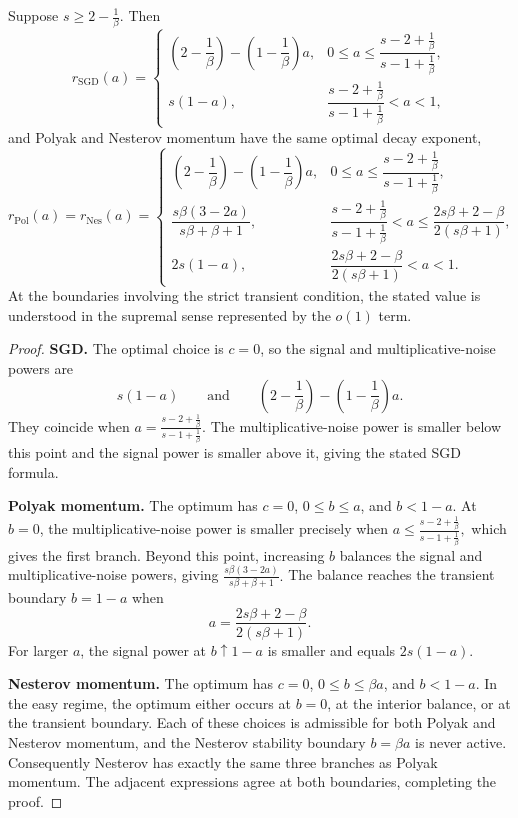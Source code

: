 \begin{theorem}
\label{thm:fixed-batch-data-scaling-noiseless-easy}
Suppose
\(s\geq2-\frac1\beta.\)
Then
\[
r_{\mathrm{SGD}}(a)
=
\begin{cases}
\left(2-\dfrac1\beta\right)-\left(1-\dfrac1\beta\right)a,
&0\leq a\leq\dfrac{s-2+\frac1\beta}{s-1+\frac1\beta},\\[3mm]
s(1-a),
&\dfrac{s-2+\frac1\beta}{s-1+\frac1\beta}<a<1,
\end{cases}
\]
and Polyak and Nesterov momentum have the same optimal decay exponent,
\[
r_{\mathrm{Pol}}(a)
=
r_{\mathrm{Nes}}(a)
=
\begin{cases}
\left(2-\dfrac1\beta\right)-\left(1-\dfrac1\beta\right)a,
&0\leq a\leq\dfrac{s-2+\frac1\beta}{s-1+\frac1\beta},\\[3mm]
\dfrac{s\beta(3-2a)}{s\beta+\beta+1},
&\dfrac{s-2+\frac1\beta}{s-1+\frac1\beta}<a
\leq\dfrac{2s\beta+2-\beta}{2(s\beta+1)},\\[3mm]
2s(1-a),
&\dfrac{2s\beta+2-\beta}{2(s\beta+1)}<a<1.
\end{cases}
\]
At the boundaries involving the strict transient condition, the stated value is understood in the supremal sense represented by the \(o(1)\) term.
\end{theorem}

\begin{proof}
\medskip

\noindent\textbf{SGD.}
The optimal choice is \(c=0\), so the signal and multiplicative-noise powers are
\[
s(1-a)
\qquad\text{and}\qquad
\left(2-\frac1\beta\right)-\left(1-\frac1\beta\right)a.
\]
They coincide when
\(a=\frac{s-2+\frac1\beta}{s-1+\frac1\beta}.\)
The multiplicative-noise power is smaller below this point and the signal power is smaller above it, giving the stated SGD formula.

\medskip

\noindent\textbf{Polyak momentum.}
The optimum has \(c=0\), \(0\leq b\leq a\), and \(b<1-a\). At \(b=0\), the multiplicative-noise power is smaller precisely when
\(a\leq\frac{s-2+\frac1\beta}{s-1+\frac1\beta},\)
which gives the first branch. Beyond this point, increasing \(b\) balances the signal and multiplicative-noise powers, giving
\(\frac{s\beta(3-2a)}{s\beta+\beta+1}.\)
The balance reaches the transient boundary \(b=1-a\) when
\[
a=\frac{2s\beta+2-\beta}{2(s\beta+1)}.
\]
For larger \(a\), the signal power at \(b\uparrow1-a\) is smaller and equals \(2s(1-a)\).

\medskip

\noindent\textbf{Nesterov momentum.}
The optimum has \(c=0\), \(0\leq b\leq\beta a\), and \(b<1-a\). In the easy regime, the optimum either occurs at \(b=0\), at the interior balance, or at the transient boundary. Each of these choices is admissible for both Polyak and Nesterov momentum, and the Nesterov stability boundary \(b=\beta a\) is never active. Consequently Nesterov has exactly the same three branches as Polyak momentum. The adjacent expressions agree at both boundaries, completing the proof.
\end{proof}

